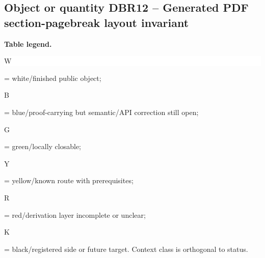 \subsection*{Object or quantity DBR12 -- Generated PDF section-pagebreak layout invariant}
\hypertarget{objproof:DBR12}{}
\par\smallskip\noindent\begin{minipage}{0.99\linewidth}\footnotesize\raggedright\textbf{Table legend.} \colorbox{white}{\strut W} = white/finished public object; \colorbox{cyan!20}{\strut B} = blue/proof-carrying but semantic/API correction still open; \colorbox{green!18}{\strut G} = green/locally closable; \colorbox{yellow!25}{\strut Y} = yellow/known route with prerequisites; \colorbox{red!20}{\strut R} = red/derivation layer incomplete or unclear; \colorbox{black!18}{\strut K} = black/registered side or future target. Context class is orthogonal to status.\end{minipage}\par\vspace{0.25em}
